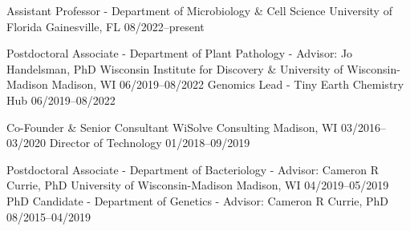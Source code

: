 

\begin{cventries}

\cventry
{Assistant Professor - Department of Microbiology \& Cell Science}
{University of Florida}
{Gainesville, FL}
{08/2022--present}
{}

\vspace{-0.4cm}

\cventry
{Postdoctoral Associate - Department of Plant Pathology - Advisor: Jo Handelsman, PhD}
{Wisconsin Institute for Discovery \& University of Wisconsin-Madison}
{Madison, WI}
{06/2019--08/2022}
{
}
\vspace{-0.4cm}
\cventry
{Genomics Lead - Tiny Earth Chemistry Hub}
{}
{}
{06/2019--08/2022}
{}

\vspace{-0.4cm}

\cventry
{Co-Founder \& Senior Consultant}
{WiSolve Consulting}
{Madison, WI}
{03/2016--03/2020}
{}
\vspace{-0.4cm}
\cventry
{Director of Technology}
{}
{}
{01/2018--09/2019}
{
}

\vspace{-0.4cm}
  
\cventry
{Postdoctoral Associate - Department of Bacteriology - Advisor: Cameron R Currie, PhD}
{University of Wisconsin-Madison}
{Madison, WI}
{04/2019--05/2019}
{}
\vspace{-0.4cm}
\cventry
{PhD Candidate - Department of Genetics - Advisor: Cameron R Currie, PhD}
{}
{}
{08/2015--04/2019}
{
}


\end{cventries}
